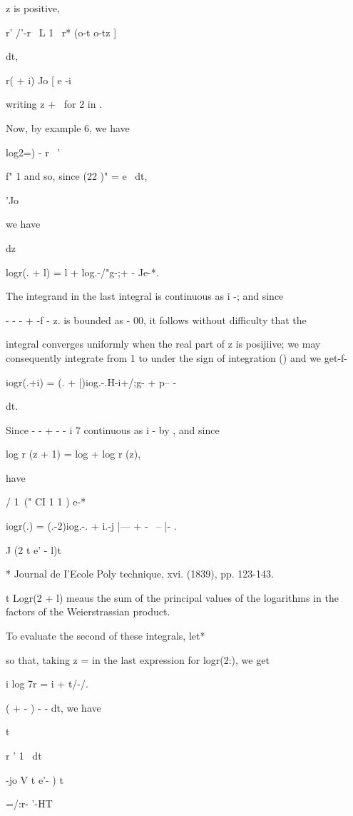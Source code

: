z is positive,

r' /'-r \ L 1 \ r* (o-t o-tz ]

dt,

r( + i) Jo [ e -i

writing z + \ for 2 in .

Now, by  example 6, we have

log2=) - r~ '

f" 1 and so, since (22 )" = e~ dt,

'Jo

we have

dz

logr(. + l) = l + log.-/"g-;+ - Je-*.

The integrand in the last integral is continuous as i -; and since

- - - + -f - z. is bounded as - 00, it follows without difficulty
that the

integral converges uniformly when the real part of z is posijiive; we
may consequently integrate from 1 to under the sign of integration
() and we get-f-

iogr(.+i) = (. + |)iog.-.H-i+/;g- + p-- -

dt.

Since - - + - - i 7 continuous as i - by , and since

log r (z + 1) = log + log r (z),

have

/ 1\ (" CI 1 1 ) e-*

iogr(.) = (.-2)iog.-. + i.-j |--- + - \ -- |- .

J (2 t e' - l)t

* Journal de I'Ecole Poly technique, xvi. (1839), pp. 123-143.

t Logr(2 + l) meaus the sum of the principal values of the logarithms
in the factors of the Weierstrassian product.

%
%

To evaluate the second of these integrals, let*

so that, taking z = in the last expression for logr(2:), we get

i log 7r = i + t/-/.

( + - ) - - dt, we have

t

r ' 1 \ dt

-jo V t e'- ) t

=/:r- '-HT

